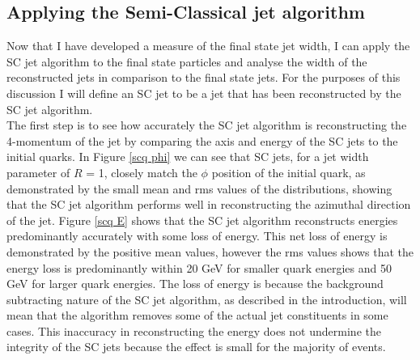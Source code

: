 \documentclass[a4paper,11pt, onecolumn]{article}
\begin{document}
  \subsection{Applying the Semi-Classical jet algorithm} \label{ss sc}
 
  Now that I have developed a measure of the final state jet width,
  I can apply the SC jet algorithm to the final state particles and analyse the width of the reconstructed jets 
  in comparison to the final state jets. For the purposes of this discussion I will define an SC jet to be a jet that has
  been reconstructed by the SC jet algorithm. \\
  
  The first step is to see how accurately the SC jet algorithm is reconstructing the 4-momentum of the jet by comparing the axis and energy of the 
  SC jets to the initial quarks. In Figure \ref{scq phi} we can see that SC jets, for a jet width parameter of $R$ = 1, closely match the $\phi$ position of the initial quark, as demonstrated by
  the small mean and rms values of the distributions, showing that the SC jet algorithm performs well in reconstructing the azimuthal direction of the jet.
  Figure \ref{scq E} shows that the SC jet algorithm reconstructs energies predominantly accurately 
  with some loss of energy. This net loss of energy is demonstrated by the positive mean values, however the rms values shows that the energy loss
  is predominantly  within 20 GeV for smaller quark energies and 50 GeV for larger quark energies. The loss of energy is because the background subtracting 
  nature of the SC jet algorithm, as described in the introduction, will mean that the algorithm removes some of the actual jet constituents in some cases. This inaccuracy in 
  reconstructing the energy does not undermine the integrity of the SC jets because the effect is small for the majority of events.\\
\end{document}
